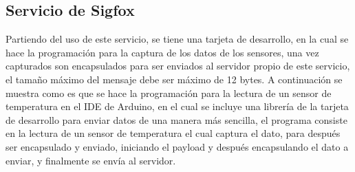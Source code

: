 \documentclass[12pt]{book}
\begin{document}
\subsection{Servicio de Sigfox}
Partiendo del uso de este servicio, se tiene una tarjeta de desarrollo, en la cual se hace la programación para la captura de los datos de los sensores, una vez capturados son encapsulados para ser enviados al servidor propio de este servicio, el tamaño máximo del mensaje debe ser máximo de 12 bytes. A continuación se muestra como es que se hace la programación para la lectura de un sensor de temperatura en el IDE de Arduino, en el cual se incluye una librería de la tarjeta de desarrollo para enviar datos de una manera más sencilla, el programa consiste en la lectura de un sensor de temperatura el cual captura el dato, para después ser encapsulado y enviado, iniciando el payload y después encapsulando el dato a enviar, y finalmente se envía al servidor.
\end{document}

